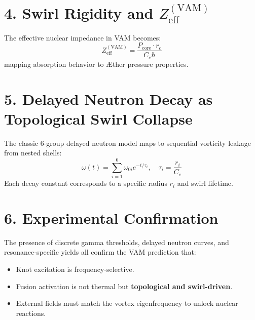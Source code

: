 \section*{4. Swirl Rigidity and $Z_{\mathrm{eff}}^{(\mathrm{VAM})}$}
The effective nuclear impedance in VAM becomes:
\[
Z_{\mathrm{eff}}^{(\mathrm{VAM})} = \frac{P_{\mathrm{core}} \cdot r_c}{C_e \hbar}
\]
mapping absorption behavior to Æther pressure properties.
\section*{5. Delayed Neutron Decay as Topological Swirl Collapse}
The classic 6-group delayed neutron model maps to sequential vorticity leakage from nested shells:
\[
\omega(t) = \sum_{i=1}^6 \omega_{0i} e^{-t/\tau_i}, \quad \tau_i = \frac{r_i}{C_e}
\]
Each decay constant corresponds to a specific radius $r_i$ and swirl lifetime.
\section*{6. Experimental Confirmation}
The presence of discrete gamma thresholds, delayed neutron curves, and resonance-specific yields all confirm the VAM prediction that:
\begin{itemize}
  \item Knot excitation is frequency-selective.
  \item Fusion activation is not thermal but \textbf{topological and swirl-driven}.
  \item External fields must match the vortex eigenfrequency to unlock nuclear reactions.
\end{itemize}
